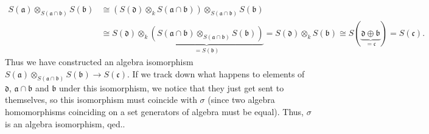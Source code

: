 \documentclass
[numbers=enddot,12pt,final,onecolumn,german,notitlepage]{scrartcl}%
\theoremstyle{definition}
\begin{document}
{\begin{align*}
S\left(  \mathfrak{a}\right)  \otimes_{S\left(  \mathfrak{a}\cap
\mathfrak{b}\right)  }S\left(  \mathfrak{b}\right)   &  \cong\left(  S\left(
\mathfrak{d}\right)  \otimes_{k}S\left(  \mathfrak{a}\cap\mathfrak{b}\right)
\right)  \otimes_{S\left(  \mathfrak{a}\cap\mathfrak{b}\right)  }S\left(
\mathfrak{b}\right) \\
&  \cong S\left(  \mathfrak{d}\right)  \otimes_{k}\underbrace{\left(  S\left(
\mathfrak{a}\cap\mathfrak{b}\right)  \otimes_{S\left(  \mathfrak{a}%
\cap\mathfrak{b}\right)  }S\left(  \mathfrak{b}\right)  \right)  }_{=S\left(
\mathfrak{b}\right)  }=S\left(  \mathfrak{d}\right)  \otimes_{k}S\left(
\mathfrak{b}\right)  \cong S\left(  \underbrace{\mathfrak{d}\oplus
\mathfrak{b}}_{=\mathfrak{c}}\right)  =S\left(  \mathfrak{c}\right)  .
\end{align*}
Thus we have constructed an algebra isomorphism $S\left(  \mathfrak{a}\right)
\otimes_{S\left(  \mathfrak{a}\cap\mathfrak{b}\right)  }S\left(
\mathfrak{b}\right)  \rightarrow S\left(  \mathfrak{c}\right)  $. If we track
down what happens to elements of $\mathfrak{d}$, $\mathfrak{a}\cap
\mathfrak{b}$ and $\mathfrak{b}$ under this isomorphism, we notice that they
just get sent to themselves, so this isomorphism must coincide with $\sigma$
(since two algebra homomorphisms coinciding on a set generators of algebra
must be equal). Thus, $\sigma$ is an algebra isomorphism, qed.}.
\end{document}
